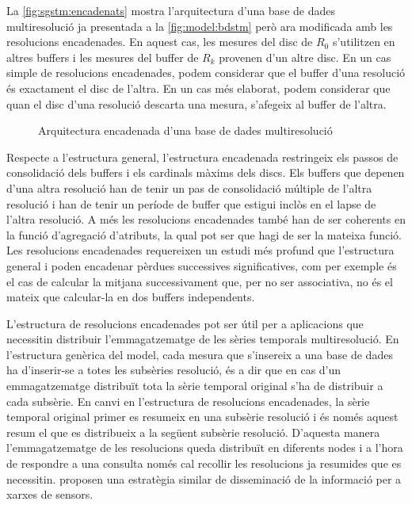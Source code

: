 La \autoref{fig:sgstm:encadenats} mostra l'arquitectura d'una base de
dades multiresolució ja presentada a la \autoref{fig:model:bdstm} però
ara modificada amb les resolucions encadenades.  En aquest cas, les
mesures del disc de $R_0$ s'utilitzen en altres buffers i les mesures
del buffer de $R_k$ provenen d'un altre disc. En un cas simple de
resolucions encadenades, podem considerar que el buffer d'una
resolució és exactament el disc de l'altra. En un cas més elaborat,
podem considerar que quan el disc d'una resolució descarta una mesura,
s'afegeix al buffer de l'altra.


\begin{figure}[tp]
  \centering
  
  \caption{Arquitectura encadenada d'una base de dades multiresolució}
  \label{fig:sgstm:encadenats}
\end{figure}


Respecte a l'estructura general, l'estructura encadenada restringeix
els passos de consolidació dels buffers i els cardinals màxims dels
discs. Els buffers que depenen d'una altra resolució han de tenir un
pas de consolidació múltiple de l'altra resolució i han de tenir un
període de buffer que estigui inclòs en el lapse de l'altra resolució.
A més les resolucions encadenades també han de ser coherents en la
funció d'agregació d'atributs, la qual pot ser que hagi de ser la
mateixa funció. Les resolucions encadenades requereixen un estudi més
profund que l'estructura general i poden encadenar pèrdues successives
significatives, com per exemple és el cas de calcular la mitjana
successivament que, per no ser associativa, no és el mateix que
calcular-la en dos buffers independents.


L'estructura de resolucions encadenades pot ser útil per a aplicacions
que necessitin distribuir l'emmagatzematge de les sèries temporals
multiresolució.  En l'estructura genèrica del model, cada mesura que
s'insereix a una base de dades ha d'inserir-se a totes les subsèries
resolució, és a dir que en cas d'un emmagatzematge distribuït tota la
sèrie temporal original s'ha de distribuir a cada subsèrie.  En canvi
en l'estructura de resolucions encadenades, la sèrie temporal original
primer es resumeix en una subsèrie resolució i és només aquest resum
el que es distribueix a la següent subsèrie resolució.  D'aquesta
manera l'emmagatzematge de les resolucions queda distribuït en
diferents nodes i a l'hora de respondre a una consulta només cal
recollir les resolucions ja resumides que es necessitin.
\textcite{deligiannakis07} proposen una estratègia similar de
disseminació de la informació per a xarxes de sensors.


